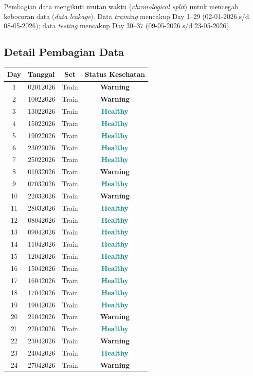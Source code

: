 \documentclass[12pt,a4paper]{report}
\newcommand{\healthy}{\textcolor{teal}{\textbf{Healthy}}}
\newcommand{\warning}{\textcolor{orange!80!black}{\textbf{Warning}}}
\begin{document}
Pembagian data mengikuti urutan waktu (\textit{chronological split}) untuk mencegah kebocoran data (\textit{data leakage}). Data \textit{training} mencakup Day 1--29 (02-01-2026 s/d 08-05-2026); data \textit{testing} mencakup Day 30--37 (09-05-2026 s/d 23-05-2026).

\subsection{Detail Pembagian Data}
\begin{longtable}{clcc}
    \toprule
    \textbf{Day} & \textbf{Tanggal} & \textbf{Set} & \textbf{Status Kesehatan} \\
    \midrule
    \endhead
    1  & 02012026 & Train & \warning \\
    2  & 10022026 & Train & \warning \\
    3  & 13022026 & Train & \healthy \\
    4  & 15022026 & Train & \healthy \\
    5  & 19022026 & Train & \healthy \\
    6  & 23022026 & Train & \healthy \\
    7  & 25022026 & Train & \healthy \\
    8  & 01032026 & Train & \warning \\
    9  & 07032026 & Train & \healthy \\
    10 & 22032026 & Train & \warning \\
    11 & 28032026 & Train & \healthy \\
    12 & 08042026 & Train & \healthy \\
    13 & 09042026 & Train & \healthy \\
    14 & 11042026 & Train & \healthy \\
    15 & 12042026 & Train & \healthy \\
    16 & 15042026 & Train & \healthy \\
    17 & 16042026 & Train & \healthy \\
    18 & 17042026 & Train & \healthy \\
    19 & 19042026 & Train & \healthy \\
    20 & 21042026 & Train & \warning \\
    21 & 22042026 & Train & \healthy \\
    22 & 23042026 & Train & \warning \\
    23 & 24042026 & Train & \healthy \\
    24 & 27042026 & Train & \warning \\

\end{longtable}
\end{document}
